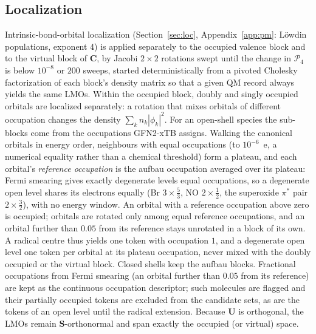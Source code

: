 \documentclass[11pt,a4paper]{article}
\newcommand{\vb}[1]{\bm{#1}}
\begin{document}
\subsection{Localization}
Intrinsic-bond-orbital localization (Section~\ref{sec:loc}, Appendix~\ref{app:pm}: L\"owdin populations, exponent 4) is applied separately to the occupied valence block and to the virtual block of $\vb{C}$, by Jacobi $2\times2$ rotations swept until the change in $\mathcal{P}_4$ is below $10^{-8}$ or $200$ sweeps, started deterministically from a pivoted Cholesky factorization of each block's density matrix so that a given QM record always yields the same LMOs. Within the occupied block, doubly and singly occupied orbitals are localized separately: a rotation that mixes orbitals of different occupation changes the density $\sum_k n_k|\phi_k|^2$. For an open-shell species the sub-blocks come from the occupations GFN2-xTB assigns. Walking the canonical orbitals in energy order, neighbours with equal occupations (to $10^{-6}$~e, a numerical equality rather than a chemical threshold) form a plateau, and each orbital's \emph{reference occupation} is the aufbau occupation averaged over its plateau: Fermi smearing gives exactly degenerate levels equal occupations, so a degenerate open level shares its electrons equally (Br $3\times\tfrac53$, NO $2\times\tfrac12$, the superoxide $\pi^*$ pair $2\times\tfrac32$), with no energy window. An orbital with a reference occupation above zero is occupied; orbitals are rotated only among equal reference occupations, and an orbital further than $0.05$ from its reference stays unrotated in a block of its own. A radical centre thus yields one token with occupation $1$, and a degenerate open level one token per orbital at its plateau occupation, never mixed with the doubly occupied or the virtual block. Closed shells keep the aufbau blocks. Fractional occupations from Fermi smearing (an orbital further than $0.05$ from its reference) are kept as the continuous occupation descriptor; such molecules are flagged and their partially occupied tokens are excluded from the candidate sets, as are the tokens of an open level until the radical extension. Because $\vb{U}$ is orthogonal, the LMOs remain $\vb{S}$-orthonormal and span exactly the occupied (or virtual) space.
\end{document}
